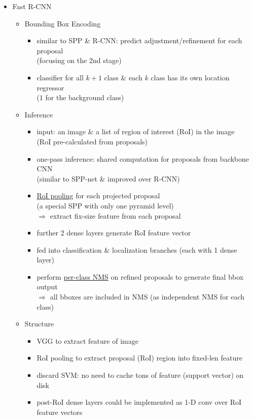 \begin{itemize}
\item Fast R-CNN
	\begin{itemize}
	\item Bounding Box Encoding
		\begin{itemize}
		\item similar to SPP \& R-CNN: predict adjustment/refinement for each proposal \\
		(focusing on the 2nd stage)
		\item classifier for all $k+1$ class \& each $k$ class has its own location regressor \\
		($1$ for the background class)
		\end{itemize}
	\item Inference
		\begin{itemize}
		\item input: an image \& a list of region of interest (RoI) in the image \\
		(RoI pre-calculated from proposals)
		\item one-pass inference: shared computation for proposals from backbone CNN \\
		(similar to SPP-net \& improved over R-CNN)
		\item \hyperref[DL_Layers_Pooling_roi]{RoI pooling} for each projected proposal \\
		(a special SPP with only one pyramid level) \\
		$\Rightarrow$ extract fix-size feature from each proposal
		\item further 2 dense layers generate RoI feature vector
		\item fed into classification \& localization branches (each with 1 dense layer)
		\item perform \underline{per-class NMS} on refined proposals to generate final bbox output \\
		$\Rightarrow$ all bboxes are included in NMS (as independent NMS for each class)
		\end{itemize}
	\item Structure
		\begin{itemize}
		\item VGG to extract feature of image
		\item RoI pooling to extract proposal (RoI) region into fixed-len feature
		\item discard SVM: no need to cache tons of feature (support vector) on disk
		\item post-RoI dense layers could be implemented as 1-D conv over RoI feature vectors

\end{itemize}
\end{itemize}
\end{itemize}
